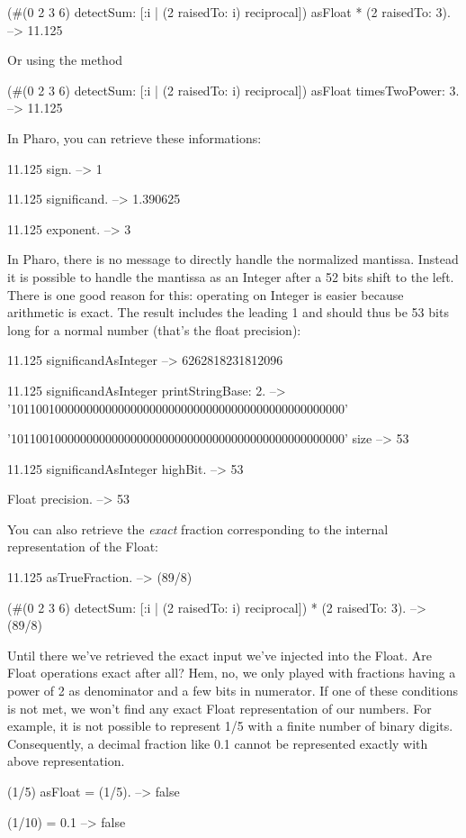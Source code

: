 \documentclass[a4paper,10pt,twoside]{book}
\begin{document}
\begin{code}{}
(#(0 2 3 6) detectSum: [:i | (2 raisedTo: i) reciprocal]) asFloat * (2 raisedTo: 3). 
	--> 11.125
\end{code}

Or using the method 

\begin{code}{}
(#(0 2 3 6) detectSum: [:i | (2 raisedTo: i) reciprocal]) asFloat timesTwoPower: 3.
	--> 11.125
\end{code}

In Pharo, you can retrieve these informations:
 \begin{code}{}
11.125 sign.
	--> 1
	
11.125 significand.
	--> 1.390625
	
11.125 exponent.
	--> 3
\end{code}



In Pharo, there is no message to directly handle the normalized mantissa. Instead it is possible to handle the mantissa as an Integer after a 52 bits shift to the left. There is one good reason for this: operating on Integer is easier because arithmetic is exact. The result includes the leading 1 and should thus be 53 bits long for a normal number (that's the float precision):


\begin{code}{}
11.125 significandAsInteger 
	--> 6262818231812096 
 
11.125 significandAsInteger printStringBase: 2.
	--> '10110010000000000000000000000000000000000000000000000'
	
'10110010000000000000000000000000000000000000000000000' size
	--> 53
	
11.125 significandAsInteger highBit.
	--> 53
	
Float precision.
	--> 53
\end{code}

You can also retrieve the \emph{exact} fraction corresponding to the internal representation of the Float:
 \begin{code}{}
 11.125 asTrueFraction.
	-->  (89/8)

(#(0 2 3 6) detectSum: [:i | (2 raisedTo: i) reciprocal]) * (2 raisedTo: 3).
	-->  (89/8)
\end{code}

Until there we've retrieved the exact input we've injected into the Float. Are Float operations exact after all? Hem, no, we only played with fractions having a power of 2 as denominator and a few bits in numerator. If one of these conditions is not met, we won't find any exact Float representation of our numbers. For example, it is not possible to represent 1/5 with a finite number of binary digits. Consequently, a decimal fraction like 0.1 cannot be represented exactly with above representation.
 \begin{code}{}
(1/5) asFloat = (1/5).
	--> false
	
(1/10) = 0.1
	--> false
\end{code}
\end{document}
